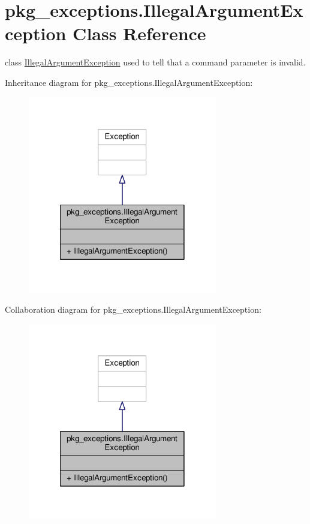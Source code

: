 \hypertarget{classpkg__exceptions_1_1IllegalArgumentException}{\section{pkg\-\_\-exceptions.\-Illegal\-Argument\-Exception Class Reference}
\label{classpkg__exceptions_1_1IllegalArgumentException}
}


class \hyperlink{classpkg__exceptions_1_1IllegalArgumentException}{Illegal\-Argument\-Exception} used to tell that a command parameter is invalid.  




Inheritance diagram for pkg\-\_\-exceptions.\-Illegal\-Argument\-Exception\-:\nopagebreak
\begin{figure}[H]
\begin{center}
\leavevmode
\includegraphics[width=234pt]{classpkg__exceptions_1_1IllegalArgumentException__inherit__graph}
\end{center}
\end{figure}


Collaboration diagram for pkg\-\_\-exceptions.\-Illegal\-Argument\-Exception\-:\nopagebreak
\begin{figure}[H]
\begin{center}
\leavevmode
\includegraphics[width=234pt]{classpkg__exceptions_1_1IllegalArgumentException__coll__graph}
\end{center}
\end{figure}
